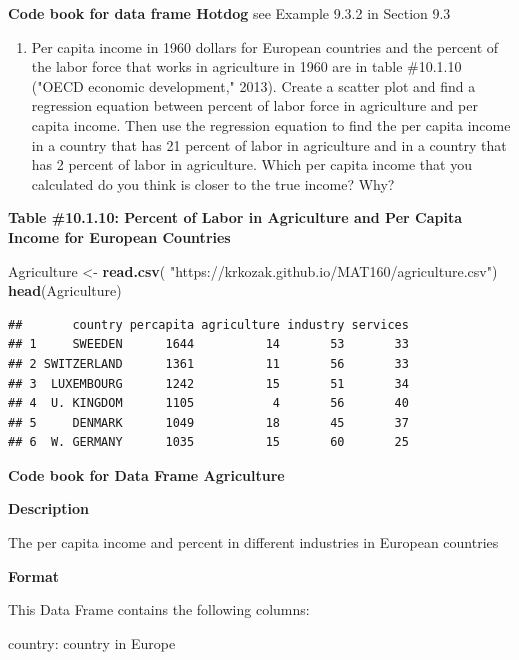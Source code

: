 \documentclass[
]{book}
\newenvironment{Shaded}{\begin{snugshade}}{\end{snugshade}}
\newcommand{\KeywordTok}[1]{\textcolor[rgb]{0.13,0.29,0.53}{\textbf{#1}}}
\newcommand{\NormalTok}[1]{#1}
\newcommand{\StringTok}[1]{\textcolor[rgb]{0.31,0.60,0.02}{#1}}
\providecommand{\tightlist}{%
  \setlength{\itemsep}{0pt}\setlength{\parskip}{0pt}}
\begin{document}
\textbf{Code book for data frame Hotdog} see Example 9.3.2 in Section 9.3

\begin{enumerate}
\def\labelenumi{\arabic{enumi}.}
\setcounter{enumi}{7}
\tightlist
\item
  Per capita income in 1960 dollars for European countries and the percent of the labor force that works in agriculture in 1960 are in table \#10.1.10 ("OECD economic development," 2013). Create a scatter plot and find a regression equation between percent of labor force in agriculture and per capita income. Then use the regression equation to find the per capita income in a country that has 21 percent of labor in agriculture and in a country that has 2 percent of labor in agriculture. Which per capita income that you calculated do you think is closer to the true income? Why?
\end{enumerate}

\textbf{Table \#10.1.10: Percent of Labor in Agriculture and Per Capita Income for European Countries}

\begin{Shaded}
\begin{Highlighting}[]
\NormalTok{Agriculture <-}\StringTok{ }\KeywordTok{read.csv}\NormalTok{(}
  \StringTok{"https://krkozak.github.io/MAT160/agriculture.csv"}\NormalTok{)}
\KeywordTok{head}\NormalTok{(Agriculture)}
\end{Highlighting}
\end{Shaded}

\begin{verbatim}
##       country percapita agriculture industry services
## 1     SWEEDEN      1644          14       53       33
## 2 SWITZERLAND      1361          11       56       33
## 3  LUXEMBOURG      1242          15       51       34
## 4  U. KINGDOM      1105           4       56       40
## 5     DENMARK      1049          18       45       37
## 6  W. GERMANY      1035          15       60       25
\end{verbatim}

\textbf{Code book for Data Frame Agriculture}

\textbf{Description}

The per capita income and percent in different industries in European countries

\textbf{Format}

This Data Frame contains the following columns:

country: country in Europe
\end{document}
